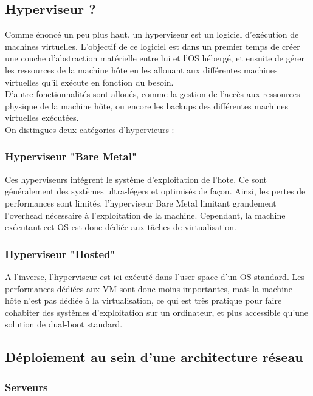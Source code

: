 \subsection{Hyperviseur ?}

Comme énoncé un peu plus haut, un hyperviseur est un logiciel d'exécution de machines virtuelles. L'objectif de ce logiciel est dans un premier temps de créer une couche d'abstraction matérielle entre lui et l'OS hébergé, et ensuite de gérer les ressources de la machine hôte en les allouant aux différentes machines virtuelles qu'il exécute en fonction du besoin.\\
D'autre fonctionnalités sont alloués, comme la gestion de l'accès aux ressources physique de la machine hôte, ou encore les backups des différentes machines virtuelles exécutées.\\
On distingues deux catégories d'hypervieurs :\\

\subsubsection{Hyperviseur "Bare Metal"}

Ces hyperviseurs intégrent le système d'exploitation de l'hote. Ce sont généralement des systèmes ultra-légers et optimisés de façon. Ainsi, les pertes de performances sont limités, l'hyperviseur Bare Metal limitant grandement l'overhead nécessaire à l'exploitation de la machine. Cependant, la machine exécutant cet OS est donc dédiée aux tâches de virtualisation.

\subsubsection{Hyperviseur "Hosted"}

A l'inverse, l'hyperviseur est ici exécuté dans l'user space d'un OS standard. Les performances dédiées aux VM sont donc moins importantes, mais la machine hôte n'est pas dédiée à la virtualisation, ce qui est très pratique pour faire cohabiter des systèmes d'exploitation sur un ordinateur, et plus accessible qu'une solution de dual-boot standard.

\subsection{Déploiement au sein d'une architecture réseau}

\subsubsection{Serveurs}

